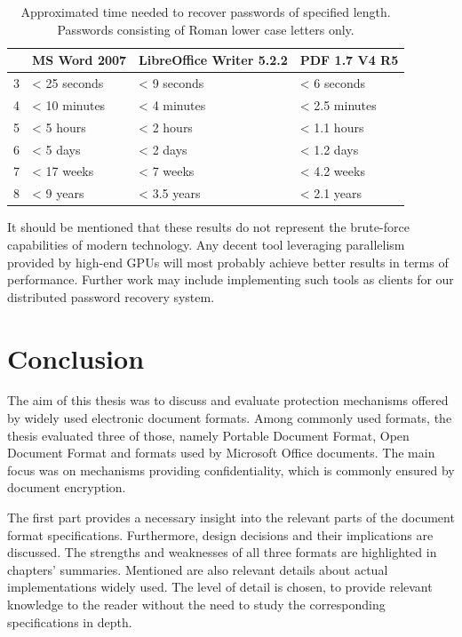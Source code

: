 \documentclass[11pt,oneside]{fithesis2}
\begin{document}
 \begin{table}[h]
	\centering
	\begin{tabular}{|l|l|l|l|}
           \hline
		&\textbf{MS Word 2007}&\textbf{LibreOffice Writer 5.2.2}&\textbf{PDF 1.7 V4 R5}\\
	\hline
		3&< 25 seconds&< 9 seconds&< 6 seconds\\
	\hline
		4&< 10 minutes&< 4 minutes&< 2.5 minutes\\
	\hline
		5&< 5 hours& < 2 hours&< 1.1 hours\\
	\hline
		6&< 5 days&< 2 days&< 1.2 days\\
	\hline
		7&< 17 weeks&< 7 weeks&< 4.2 weeks\\
	\hline
		8&< 9 years&< 3.5 years&< 2.1 years\\
	\hline
           \end{tabular}
	\caption{Approximated time needed to recover passwords of specified length. Passwords consisting of Roman lower case letters only.}
	\label{real_world_time}
\end{table}

It should be mentioned that these results do not represent the brute-force capabilities of modern technology. Any decent tool leveraging parallelism provided by high-end GPUs will most probably achieve better results in terms of performance. Further work may include implementing such tools as clients for our distributed password recovery system. 

\chapter{Conclusion}

The aim of this thesis was to discuss and evaluate protection mechanisms offered by widely used electronic document formats. Among commonly used formats, the thesis evaluated three of those, namely Portable Document Format, Open Document Format and formats used by Microsoft Office documents. The main focus was on mechanisms providing confidentiality, which is commonly ensured by document encryption. 

The first part provides a necessary insight into the relevant parts of the document format specifications. Furthermore, design decisions and their implications are discussed. The strengths and weaknesses of all three formats are highlighted in chapters' summaries. Mentioned are also relevant details about actual implementations widely used. The level of detail is chosen, to provide relevant knowledge to the reader without the need to study the corresponding specifications in depth.
\end{document}
